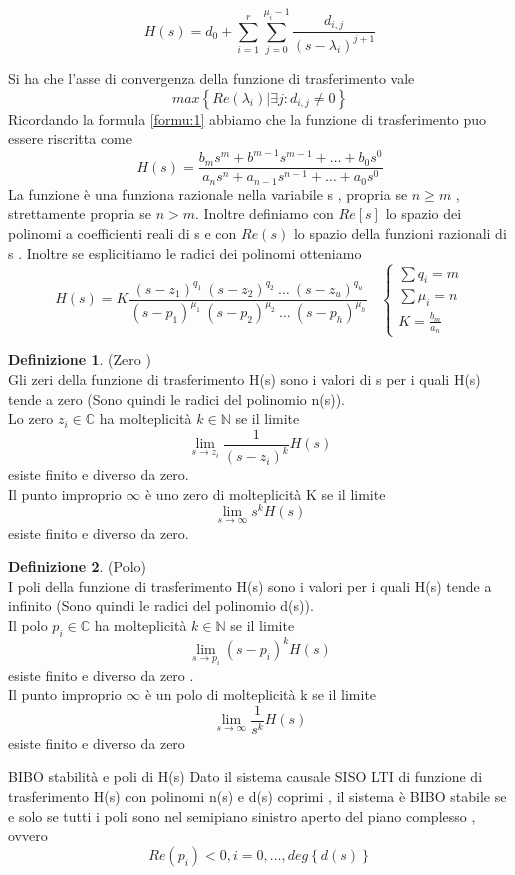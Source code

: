 \documentclass{article}
\theoremstyle{definition}
\newtheorem*{definizione}{Definizione}
\newcommand{\la}{\lambda}
\begin{document}
		\begin{tcolorbox}
		$$	H(s)=d_0 + \sum_{i=1}^{r}\sum_{j=0}^{\mu_i-1} \frac{d_{i,j}}{(s-\la_i)^{j+1}}$$
		\end{tcolorbox}
			Si ha che l'asse di convergenza della funzione di trasferimento vale 
		$$max\left\{Re(\la_i) | \exists j : d_{i,j} \neq 0\right\}$$
		Ricordando la formula \ref{formu:1} abbiamo che la funzione di trasferimento puo essere riscritta come 
		$$H(s)=\frac{b_ms^m+b^{m-1}s^{m-1}+\dots + b_0s^0}{a_ns^n+a_{n-1}s^{n-1}+\dots + a_0s^0}$$
		La funzione è una funziona razionale nella variabile s , propria se $n \geq m$ , strettamente propria se $n > m$. Inoltre definiamo con $Re[s]$ lo spazio dei polinomi a coefficienti reali di s e con $Re(s)$ lo spazio della funzioni razionali di s .
		Inoltre se esplicitiamo le radici dei polinomi otteniamo 
		$$H(s)=K\frac{(s-z_1)^{q_1} \ (s-z_2)^{q_2}\ \dots \ (s-z_u)^{q_u}}{(s-p_1)^{\mu_1} \ (s-p_2)^{\mu_2}\ \dots \ (s-p_h)^{\mu_h}} \ \ \ \ \begin{cases}
			\sum q_i = m \\
			\sum \mu_i = n \\
			K=\frac{b_m}{a_n}
		\end{cases}$$ 
		
		
	\begin{definizione} (Zero ) \\
		Gli zeri della funzione di trasferimento H(s) sono i valori di s  per i quali H(s) tende a zero (Sono quindi le radici del polinomio n(s)). \\
		Lo zero $z_i \in \mathbb{C}$ ha molteplicità $k \in \mathbb{N}$ se il limite 
		$$\lim_{s\rightarrow z_i } \frac{1}{(s-z_i)^k}H(s)$$ esiste finito e diverso da zero. \\
		Il punto improprio $\infty$ è uno zero di molteplicità K se il limite 
		$$\lim_{s \rightarrow \infty} s^k H(s)$$ esiste finito e diverso da zero. 
	\end{definizione} 
\begin{definizione}(Polo) \\ 
I poli della funzione di trasferimento H(s) sono i valori per i quali H(s) tende a infinito (Sono quindi le radici del polinomio d(s)). \\
Il polo $p_i \in \mathbb{C}$ ha molteplicità $k \in \mathbb{N}$ se il limite 
$$\lim_{s \rightarrow p_i} (s-p_i)^k H(s)$$ esiste finito e diverso da  zero .\\
Il punto improprio $\infty$ è un polo di molteplicità  k se il limite 
$$\lim_{s \rightarrow \infty  }\frac{1}{s^k}H(s)$$ esiste finito e diverso da zero 
\end{definizione}
\begin{teo}{BIBO stabilità e poli di H(s)}{}
	Dato il sistema causale SISO LTI di funzione di trasferimento H(s) con polinomi n(s) e d(s) coprimi , il sistema è BIBO stabile se e solo se tutti i poli sono nel semipiano sinistro aperto del piano complesso , ovvero $$Re(p_i) < 0 , i= 0 , \dots , deg\left\{d(s)\right\} $$
\end{teo}
\end{document}
